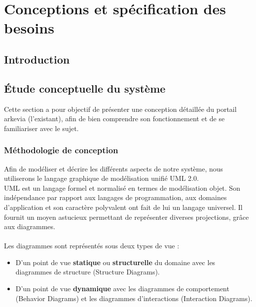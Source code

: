 \section{Conceptions et spécification des besoins}
\subsection*{Introduction}
\subsection{Étude conceptuelle du système}
Cette section a pour objectif de présenter une conception détaillée du portail arkevia (l'existant), afin de bien comprendre son fonctionnement et de se familiariser avec le sujet.
\subsubsection{Méthodologie de conception}
Afin de modéliser et décrire les différents aspects de notre système, nous utiliserons le langage
graphique de modélisation unifié UML 2.0.\\
UML est un langage formel et normalisé en termes de modélisation objet. Son indépendance par rapport aux langages de programmation, aux domaines d’application et son caractère polyvalent ont fait de lui un langage universel. Il fournit un moyen astucieux permettant de représenter diverses projections, grâce aux diagrammes.\\\\
Les diagrammes sont représentés sous deux types de vue :
\begin{itemize}
    \item D’un point de vue \textbf{statique} ou \textbf{structurelle} du domaine avec les diagrammes de structure (Structure Diagrams).
    \item D’un point de vue \textbf{dynamique} avec les diagrammes de comportement (Behavior Diagrams) et les diagrammes d’interactions (Interaction Diagrams).\\
\end{itemize}

